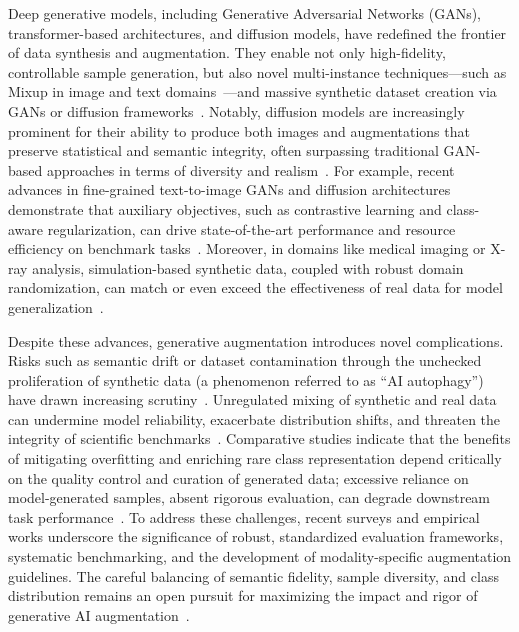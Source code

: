 \documentclass[sigconf]{acmart}
\begin{document}
Deep generative models, including Generative Adversarial Networks (GANs), transformer-based architectures, and diffusion models, have redefined the frontier of data synthesis and augmentation. They enable not only high-fidelity, controllable sample generation, but also novel multi-instance techniques—such as Mixup in image and text domains~\cite{ref61,ref62,ref64}—and massive synthetic dataset creation via GANs or diffusion frameworks~\cite{ref61,ref62,ref81,ref82,ref87,ref101}. Notably, diffusion models are increasingly prominent for their ability to produce both images and augmentations that preserve statistical and semantic integrity, often surpassing traditional GAN-based approaches in terms of diversity and realism~\cite{ref82,ref87,ref101,ref102}. For example, recent advances in fine-grained text-to-image GANs and diffusion architectures demonstrate that auxiliary objectives, such as contrastive learning and class-aware regularization, can drive state-of-the-art performance and resource efficiency on benchmark tasks~\cite{ref101,ref102}. Moreover, in domains like medical imaging or X-ray analysis, simulation-based synthetic data, coupled with robust domain randomization, can match or even exceed the effectiveness of real data for model generalization~\cite{ref81}.

Despite these advances, generative augmentation introduces novel complications. Risks such as semantic drift or dataset contamination through the unchecked proliferation of synthetic data (a phenomenon referred to as ``AI autophagy'') have drawn increasing scrutiny~\cite{ref82}. Unregulated mixing of synthetic and real data can undermine model reliability, exacerbate distribution shifts, and threaten the integrity of scientific benchmarks~\cite{ref82,ref90,ref101}. Comparative studies indicate that the benefits of mitigating overfitting and enriching rare class representation depend critically on the quality control and curation of generated data; excessive reliance on model-generated samples, absent rigorous evaluation, can degrade downstream task performance~\cite{ref90,ref101}. To address these challenges, recent surveys and empirical works underscore the significance of robust, standardized evaluation frameworks, systematic benchmarking, and the development of modality-specific augmentation guidelines. The careful balancing of semantic fidelity, sample diversity, and class distribution remains an open pursuit for maximizing the impact and rigor of generative AI augmentation~\cite{ref61,ref62,ref64,ref82,ref87,ref90,ref101,ref102}.
\end{document}
